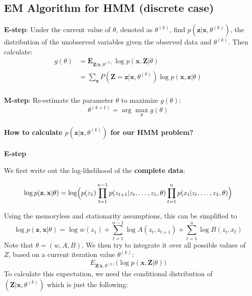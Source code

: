 \documentclass[
]{book}
\begin{document}
\subsection{EM Algorithm for HMM (discrete case)}\label{em-algorithm-for-hmm-discrete-case}

\textbf{E-step}: Under the current value of \(\theta\), denoted as \(\theta^{(k)}\), find \(p(\mathbf{z}|\mathbf{x}, \theta^{(k)})\), the distribution of the unobserved variables given
the observed data and \(\theta^{(k)}\). Then calculate:
\begin{align*}
g(\theta) &= \mathbf{E}_{\mathbf{Z}|\mathbf{x}, \theta^{(k)}} \log p(\mathbf{x}, \mathbf{Z} | \theta) \\
&= \sum_{\mathbf{z}} P(\mathbf{Z}=\mathbf{z} |\mathbf{x}, \theta^{(k)}) \log p(\mathbf{x}, \mathbf{z} |\theta)\\
\end{align*}

\textbf{M-step}: Re-estimate the parameter \(\theta\) to maximize \(g(\theta)\):
\[\theta^{(k+1)} = \arg \max_{\theta} g(\theta)\]

\paragraph*{\texorpdfstring{How to calculate \(p(\mathbf{z}|\mathbf{x}, \theta^{(k)})\) for our HMM problem?}{How to calculate p(\textbackslash mathbf\{z\}\textbar\textbackslash mathbf\{x\}, \textbackslash theta\^{}\{(k)\}) for our HMM problem?}}\label{how-to-calculate-pmathbfzmathbfx-thetak-for-our-hmm-problem}

\textbf{E-step}

We first write out the log-likelihood of the \textbf{complete data}:

\[\log p(\mathbf{z}, \mathbf{x}|\theta)
= \log \Bigl (p(z_1) \prod_{t=1}^{n-1} p(z_{t+1}|z_t, \ldots, z_1, \theta) \prod_{t=1}^{n} p(x_t|z_t, \ldots, z_1, \theta) \Bigr)\]

Using the memoryless and stationarity assumptions, this can be
simplified to
\[\log p(\mathbf{z}, \mathbf{x}|\theta)
= \log w(z_1) + \sum_{t=1}^{n-1} \log A(z_t, z_{t+1}) + \sum_{t=1}^{n} \log B(z_t, x_t)\]
Note that \(\theta = (w, A, B)\). We then try to integrate it over all possible values of \(Z\), based on a current iteration value \(\theta^{(k)}\):
\[E_{\mathbf{Z}|\mathbf{x}, \theta^{(k)}}\Biggl( \log p(\mathbf{x}, \mathbf{Z}|\theta ) \Biggr)\]
To calculate this expectation, we need the conditional distribution of \((\mathbf{Z}|\mathbf{x}, \theta^{(k)})\) which is just the following:
\end{document}
